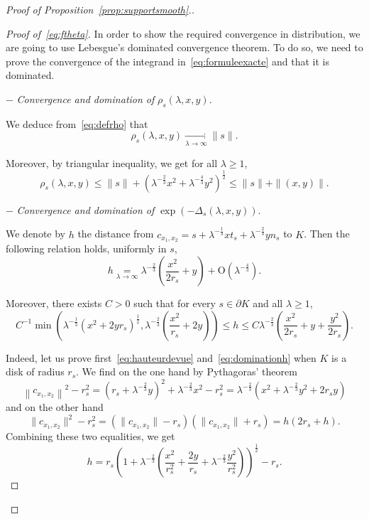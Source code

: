 \documentclass[10pt]{amsart}
\theoremstyle{definition}\newtheorem{defi}[theo]{Definition}\newtheorem{rema}[theo]{Remark}\newtheorem{exam}[theo]{Example}\newtheorem{exem}[theo]{Example}\newtheorem{nota}[theo]{Notation}
\newcommand{\Odd}{\mathrm{O}}
\newcommand{\pass}{\vspace{0.3cm}\noindent}
\newcommand{\noi}{\noindent}
\newenvironment*{prooff}{\begin{proof}}{\let\qed\relax\end{proof}}
\begin{document}
\begin{proof}[{Proof of Proposition~\ref{prop:supportsmooth}.}]
\begin{prooff}[{Proof of~\eqref{eq:ftheta}}]
In order to show the required convergence in distribution, we are going to use Lebesgue's dominated convergence theorem. To do so, we need to prove the convergence of the integrand in~\eqref{eq:formuleexacte} and that it is dominated.

$-$ \emph{Convergence and domination of} $\rho_s(\lambda,x,y)$.

We deduce from~\eqref{eq:defrho} that
\begin{equation}\label{eq:convrho}
\rho_s(\lambda,x,y)\underset{\lambda\to\infty}{\longrightarrow}\|s\|.
\end{equation}

Moreover, by triangular inequality, we get for all $\lambda\ge 1$,
\begin{equation}\label{eq:dominationrho}
\rho_s(\lambda,x,y)\le \|s\|+\left(\lambda^{-\frac{2}{3}}x^2+\lambda^{-\frac{4}{3}}y^2\right)^{\frac1{2}}\le \|s\|+\|(x,y)\|.
\end{equation}

$-$ \emph{Convergence and domination of} $\exp(-\Delta_s(\lambda,x,y))$.

We denote by $h$ the distance from $c_{x_1,x_2}=s+\lambda^{-\frac1{3}}x t_s+\lambda^{-\frac{2}{3}}y n_s$ to $K$. Then the following relation holds, uniformly in $s$,
\begin{equation}\label{eq:hauteurdevue}
h\underset{\lambda\to\infty}{=}\lambda^{-\frac{2}{3}}\left(\frac{x^2}{2r_s}+y\right)+\Odd\left(\lambda^{-\frac{4}{3}}\right).
\end{equation}

Moreover, there exists $C>0$ such that for every $s\in \partial K$ and all $\lambda\ge 1 $,
\begin{equation}\label{eq:dominationh}
C^{-1}\min\left(\lambda^{-\frac1{3}}\left(x^2+2yr_s\right)^{\frac1{2}},\lambda^{-\frac{2}{3}}\left(\frac{x^2}{r_s}+2y\right)\right)\le h\le C \lambda^{-\frac{2}{3}}\left(\frac{x^2}{2r_s}+y+\frac{y^2}{2r_s}\right).
\end{equation}

Indeed, let us prove first~\eqref{eq:hauteurdevue} and~\eqref{eq:dominationh} when $K$ is a disk of radius $r_s$. We find on the one hand by Pythagoras' theorem
\[
\left\|c_{x_1,x_2}\right\|^2-r_s^2=\left(r_s+\lambda^{-\frac{2}{3}}y\right)^2+\lambda^{-\frac{2}{3}}x^2-r_s^2=\lambda^{-\frac{2}{3}}\left(x^2+\lambda^{-\frac{2}{3}}y^2+2r_sy\right)
\]
and on the other hand
\[
\|c_{x_1,x_2}\|^2-r_s^2=(\|c_{x_1,x_2}\|-r_s)(\|c_{x_1,x_2}\|+r_s)=h(2r_s+h).
\]
Combining these two equalities, we get
\[
h=r_s\left(1+\lambda^{-\frac{2}{3}}\left(\frac{x^2}{r_s^2}+\frac{2y}{r_s}+\lambda^{-\frac{2}{3}}\frac{y^2}{r_s^2}\right)\right)^{\frac1{2}}-r_s.
\]


\end{prooff}
\end{proof}
\end{document}
